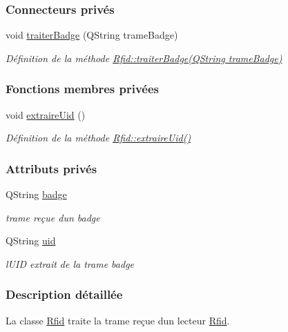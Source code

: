 \subsubsection*{Connecteurs privés}
\begin{DoxyCompactItemize}
\item 
void \hyperlink{class_rfid_a5b4f31b235afebee620e42c52ab60213}{traiter\+Badge} (Q\+String trame\+Badge)
\begin{DoxyCompactList}\small\item\em Définition de la méthode \hyperlink{class_rfid_a5b4f31b235afebee620e42c52ab60213}{Rfid\+::traiter\+Badge(\+Q\+String trame\+Badge)} \end{DoxyCompactList}\end{DoxyCompactItemize}
\subsubsection*{Fonctions membres privées}
\begin{DoxyCompactItemize}
\item 
void \hyperlink{class_rfid_a884e849f175045d78587e1e09a87cb00}{extraire\+Uid} ()
\begin{DoxyCompactList}\small\item\em Définition de la méthode \hyperlink{class_rfid_a884e849f175045d78587e1e09a87cb00}{Rfid\+::extraire\+Uid()} \end{DoxyCompactList}\end{DoxyCompactItemize}
\subsubsection*{Attributs privés}
\begin{DoxyCompactItemize}
\item 
Q\+String \hyperlink{class_rfid_ac634cd26ffbe1c6da3967dc4af53b734}{badge}
\begin{DoxyCompactList}\small\item\em trame reçue d\textquotesingle{}un badge \end{DoxyCompactList}\item 
Q\+String \hyperlink{class_rfid_a157b71d282a7e067c65b431dbae6c6c8}{uid}
\begin{DoxyCompactList}\small\item\em l\textquotesingle{}U\+ID extrait de la trame badge \end{DoxyCompactList}\end{DoxyCompactItemize}


\subsubsection{Description détaillée}
La classe \hyperlink{class_rfid}{Rfid} traite la trame reçue d\textquotesingle{}un lecteur \hyperlink{class_rfid}{Rfid}. 

